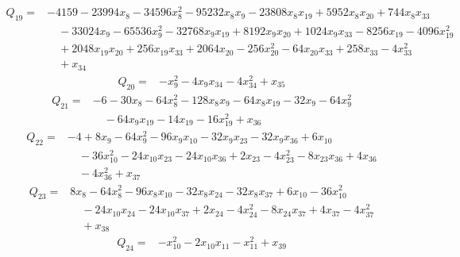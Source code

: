 \begin{equation*}\begin{split}
Q_{19}={}&-4159 - 23994x_{8} - 34596x_{8}^{2} - 95232x_{8} x_{9} - 23808x_{8} x_{19} + 5952x_{8} x_{20} + 744x_{8} x_{33}\\
&\quad -33024x_{9} - 65536x_{9}^{2} - 32768x_{9} x_{19} + 8192x_{9} x_{20} + 1024x_{9} x_{33} - 8256x_{19} - 4096x_{19}^{2}\\
&\quad + 2048x_{19} x_{20} + 256x_{19} x_{33} + 2064x_{20} - 256x_{20}^{2} - 64x_{20} x_{33} + 258x_{33} - 4x_{33}^{2}\\
&\quad + x_{34}
\end{split}\end{equation*}
\begin{equation*}\begin{split}
Q_{20}={}&-x_{9}^{2} - 4x_{9} x_{34} - 4x_{34}^{2} + x_{35}
\end{split}\end{equation*}
\begin{equation*}\begin{split}
Q_{21}={}&-6 - 30x_{8} - 64x_{8}^{2} - 128x_{8} x_{9} - 64x_{8} x_{19} - 32x_{9} - 64x_{9}^{2}\\
&\quad -64x_{9} x_{19} - 14x_{19} - 16x_{19}^{2} + x_{36}
\end{split}\end{equation*}
\begin{equation*}\begin{split}
Q_{22}={}&-4 + 8x_{9} - 64x_{9}^{2} - 96x_{9} x_{10} - 32x_{9} x_{23} - 32x_{9} x_{36} + 6x_{10}\\
&\quad -36x_{10}^{2} - 24x_{10} x_{23} - 24x_{10} x_{36} + 2x_{23} - 4x_{23}^{2} - 8x_{23} x_{36} + 4x_{36}\\
&\quad -4x_{36}^{2} + x_{37}
\end{split}\end{equation*}
\begin{equation*}\begin{split}
Q_{23}={}&8x_{8} - 64x_{8}^{2} - 96x_{8} x_{10} - 32x_{8} x_{24} - 32x_{8} x_{37} + 6x_{10} - 36x_{10}^{2}\\
&\quad -24x_{10} x_{24} - 24x_{10} x_{37} + 2x_{24} - 4x_{24}^{2} - 8x_{24} x_{37} + 4x_{37} - 4x_{37}^{2}\\
&\quad + x_{38}
\end{split}\end{equation*}
\begin{equation*}\begin{split}
Q_{24}={}&-x_{10}^{2} - 2x_{10} x_{11} - x_{11}^{2} + x_{39}
\end{split}\end{equation*}
